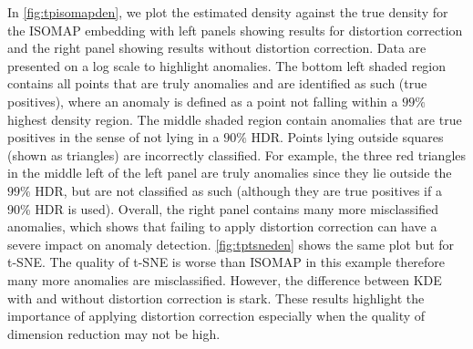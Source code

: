 \documentclass[11pt,a4paper,]{article}
\begin{document}
In \autoref{fig:tpisomapden}, we plot the estimated density against the true density for the ISOMAP embedding with left panels showing results for distortion correction and the right panel showing results without distortion correction. Data are presented on a log scale to highlight anomalies. The bottom left shaded region contains all points that are truly anomalies and are identified as such (true positives), where an anomaly is defined as a point not falling within a \(99\%\) highest density region. The middle shaded region contain anomalies that are true positives in the sense of not lying in a \(90\%\) HDR. Points lying outside squares (shown as triangles) are incorrectly classified. For example, the three red triangles in the middle left of the left panel are truly anomalies since they lie outside the \(99\%\) HDR, but are not classified as such (although they are true positives if a 90\% HDR is used). Overall, the right panel contains many more misclassified anomalies, which shows that failing to apply distortion correction can have a severe impact on anomaly detection. \autoref{fig:tptsneden} shows the same plot but for t-SNE. The quality of t-SNE is worse than ISOMAP in this example therefore many more anomalies are misclassified. However, the difference between KDE with and without distortion correction is stark. These results highlight the importance of applying distortion correction especially when the quality of dimension reduction may not be high.
\end{document}
